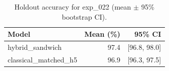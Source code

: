 \begin{table}[ht]
\centering
\caption{Holdout accuracy for exp_022 (mean $\pm$ 95\% bootstrap CI).}
\label{tab:exp_022}
\begin{tabular}{lrr}
\toprule
Model & Mean (\%) & 95\% CI \\
\midrule
hybrid\_sandwich & 97.4 & [96.8, 98.0] \\
classical\_matched\_h5 & 96.9 & [96.3, 97.5] \\
\bottomrule
\end{tabular}
\end{table}
